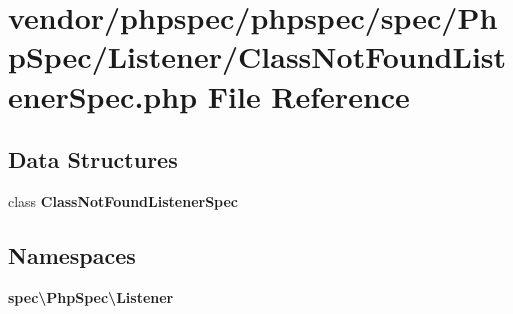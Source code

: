 \section{vendor/phpspec/phpspec/spec/\+Php\+Spec/\+Listener/\+Class\+Not\+Found\+Listener\+Spec.php File Reference}
\label{_class_not_found_listener_spec_8php}
\subsection*{Data Structures}
\begin{DoxyCompactItemize}
\item 
class {\bf Class\+Not\+Found\+Listener\+Spec}
\end{DoxyCompactItemize}
\subsection*{Namespaces}
\begin{DoxyCompactItemize}
\item 
 {\bf spec\textbackslash{}\+Php\+Spec\textbackslash{}\+Listener}
\end{DoxyCompactItemize}
